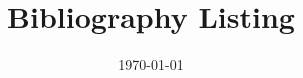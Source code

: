 \documentclass[11pt]{article}
\title{Bibliography Listing}
\date{\today}
\author{}
\begin{document}
\maketitle
\nocite{*}


\end{document}

